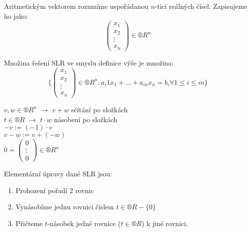 \documentclass[12pt]{article}					%
\begin{document}
    \begin{definice}
        Aritmetickým vektorem rozumíme uspořádanou $n$-tici reálných čísel. Zapisujeme ho jako:
        $$
            \begin{pmatrix}
                x_1\\x_2\\\vdots\\x_n 
            \end{pmatrix} \in ®R^n
        $$
    \end{definice}

    \begin{definice}
        Množina řešení SLR ve smyslu definice výše je množina:
        $$
            \{
                \begin{pmatrix}
                    x_1\\x_2\\\vdots\\x_n
                \end{pmatrix}
            \in ®R^n: a_i1 x_1 + … + a_{in} x_n = b_i \forall 1≤i≤m\}
        $$
    \end{definice}

    \begin{definice}
        $v, w \in ®R^n$ $\longrightarrow$ $v + w$ sčítání po složkách\\
        $t \in ®R$ $\longrightarrow$ $t \cdot w$ násobení po složkách\\
        $-v := (-1) \cdot v$\\
        $v - w := v + (-w)$\\
        $ 0 = \begin{pmatrix} 0\\ \vdots \\ 0 \end{pmatrix} \in ®R^n$
    \end{definice}

    \begin{definice}
        Elementární úpravy dané SLR jsou:
        \begin{enumerate}
            \item Prohození pořadí 2 rovnic
            \item Vynásobíme jednu rovnici číslem $t \in ®R - \{0\}$
            \item Přičteme $t$-násobek jedné rovnice ($t \in ®R$) k jiné rovnici.
        \end{enumerate}
    \end{definice}
\end{document}
